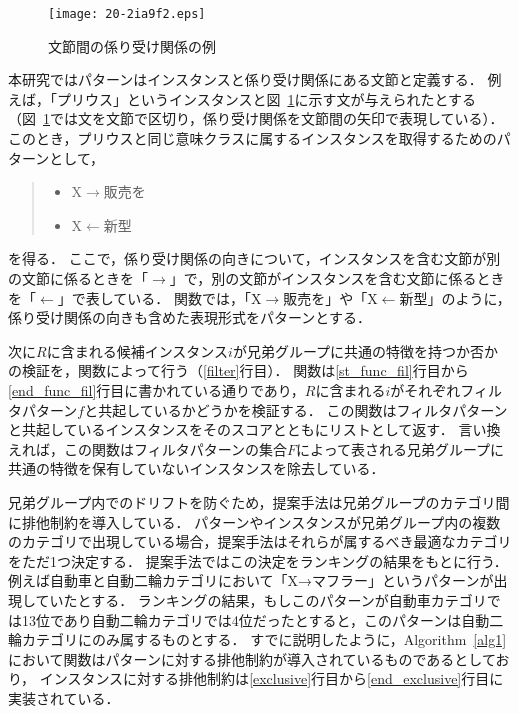 \documentclass[japanese]{jnlp_1.4}
\begin{document}
\begin{figure}[t]
\begin{center}
\texttt{[image: 20-2ia9f2.eps]}
\end{center}
 \caption{文節間の係り受け関係の例}
 \label{eg:sentence}
\end{figure}

本研究ではパターンはインスタンスと係り受け関係にある文節と定義する．
例えば，「プリウス」というインスタンスと図~\ref{eg:sentence}に示す文が与えられたとする（図~\ref{eg:sentence}では文を文節で区切り，係り受け関係を文節間の矢印で表現している）．
このとき，プリウスと同じ意味クラスに属するインスタンスを取得するためのパターンとして，



\begin{quote}
\begin{itemize}
\item X$\longrightarrow$販売を
\item X$\longleftarrow$新型
\end{itemize}
\end{quote}
を得る．
ここで，係り受け関係の向きについて，インスタンスを含む文節が別の文節に係るときを「$\to$」で，別の文節がインスタンスを含む文節に係るときを「$\gets$」で表している．
関数では，「X$\to$販売を」や「X$\gets$新型」のように，係り受け関係の向きも含めた表現形式をパターンとする．

次に$R$に含まれる候補インスタンス$i$が兄弟グループに共通の特徴を持つか否かの検証を，関数によって行う（\ref{filter}行目）．
関数は\ref{st_func_fil}行目から\ref{end_func_fil}行目に書かれている通りであり，$R$に含まれる$i$がそれぞれフィルタパターン$f$と共起しているかどうかを検証する．
この関数はフィルタパターンと共起しているインスタンスをそのスコアとともにリストとして返す．
言い換えれば，この関数はフィルタパターンの集合$F$によって表される兄弟グループに共通の特徴を保有していないインスタンスを除去している．

兄弟グループ内でのドリフトを防ぐため，提案手法は兄弟グループのカテゴリ間に排他制約を導入している．
パターンやインスタンスが兄弟グループ内の複数のカテゴリで出現している場合，提案手法はそれらが属するべき最適なカテゴリをただ1つ決定する．
提案手法ではこの決定をランキングの結果をもとに行う．
例えば自動車と自動二輪カテゴリにおいて「X→マフラー」というパターンが出現していたとする．
ランキングの結果，もしこのパターンが自動車カテゴリでは13位であり自動二輪カテゴリでは4位だったとすると，このパターンは自動二輪カテゴリにのみ属するものとする．
すでに説明したように，Algorithm~\ref{alg1}において関数はパターンに対する排他制約が導入されているものであるとしており，
インスタンスに対する排他制約は\ref{exclusive}行目から\ref{end_exclusive}行目に実装されている．
\end{document}
